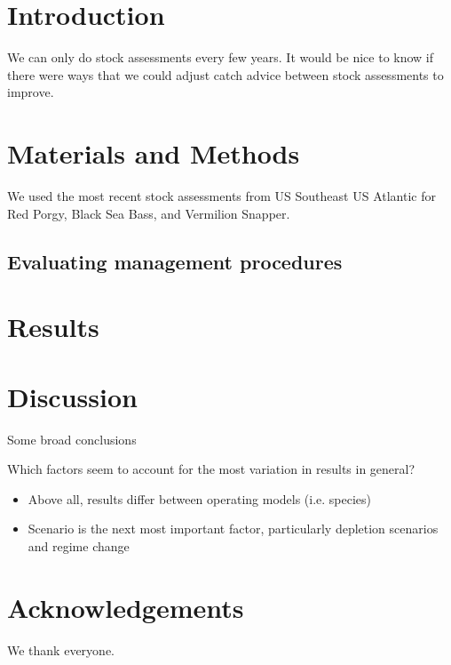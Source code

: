 \documentclass[12pt,english]{article}
\begin{document}
\begin{flushleft}
\begin{spacing}{1.9}
\setlength{\parindent}{1cm} %

\section*{Introduction}
We can only do stock assessments every few years. It would be nice to know if there were ways that we could adjust catch advice between stock assessments to improve.


\section*{Materials and Methods}
We used the most recent stock assessments from US Southeast US Atlantic for Red Porgy, Black Sea Bass, and Vermilion Snapper.

\subsection{Evaluating management procedures}

\section*{Results}


\section*{Discussion}

Some broad conclusions

Which factors seem to account for the most variation in results in general?
\begin{itemize}
\item Above all, results differ between operating models (i.e. species)
\item Scenario is the next most important factor, particularly depletion scenarios and regime change
\end{itemize}

\section*{Acknowledgements}
We thank everyone.

\end{spacing}
\end{flushleft}
\end{document}
